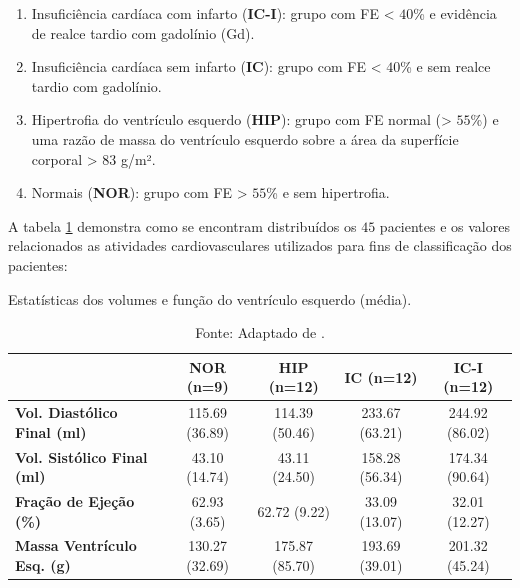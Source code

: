 \begin{enumerate}
    \item Insuficiência cardíaca com infarto (\textbf{IC-I}): grupo com \gls{FE} < $40$\% e evidência de realce tardio com gadolínio (Gd).
    \item Insuficiência cardíaca sem infarto (\textbf{IC}): grupo com \gls{FE} < $40$\% e sem realce tardio com gadolínio.
    \item Hipertrofia do ventrículo esquerdo (\textbf{HIP}): grupo com \gls{FE} normal (> $55$\%) e uma razão de massa do ventrículo esquerdo sobre a área da superfície corporal > $83$ g/m².
    \item Normais (\textbf{NOR}): grupo com \gls{FE} > $55$\% e sem hipertrofia.
\end{enumerate}

\noindent A tabela \ref{tab:sunny_stats} demonstra como se encontram distribuídos os $45$ pacientes e os valores relacionados as atividades cardiovasculares utilizados para fins de classificação dos pacientes:
\newline

\begin{table}[h!]
\centering
\caption{Estatísticas dos volumes e função do ventrículo esquerdo (média).}
\begin{tabular}{@{}lcccc@{}}
\toprule
\textbf{}  & \textbf{NOR (n=9)} & \textbf{HIP (n=12)} & \textbf{IC (n=12)} & \textbf{IC-I (n=12)} \\ \midrule
\textbf{Vol. Diastólico Final (ml)} & 115.69 (36.89)   & 114.39 (50.46)      & 233.67 (63.21)     & 244.92 (86.02)       \\
\textbf{Vol. Sistólico Final (ml)}  & 43.10 (14.74)    & 43.11 (24.50)       & 158.28 (56.34)     & 174.34 (90.64)       \\
\textbf{Fração de Ejeção (\%)}        & 62.93 (3.65)     & 62.72 (9.22)        & 33.09 (13.07)      & 32.01 (12.27)        \\
\textbf{Massa Ventrículo Esq. (g)} & 130.27 (32.69)   & 175.87 (85.70)      & 193.69 (39.01)     & 201.32 (45.24)       \\ \bottomrule
\end{tabular}
\caption*{Fonte: Adaptado de \cite{radauEvaluationFrameworkAlgorithms2009}.}
\label{tab:sunny_stats}
\end{table}



